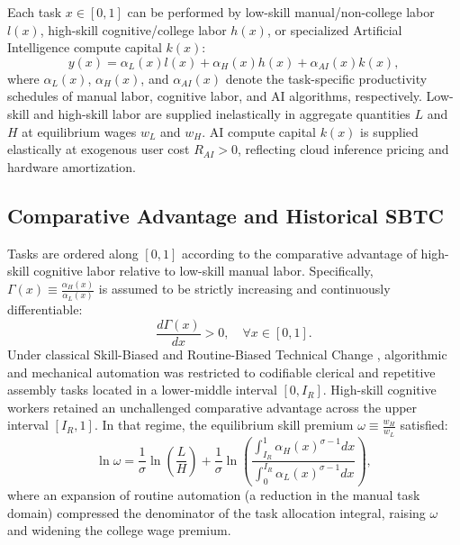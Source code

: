 \documentclass[12pt]{article}
\begin{document}
Each task $x \in [0, 1]$ can be performed by low-skill manual/non-college labor $l(x)$, high-skill cognitive/college labor $h(x)$, or specialized Artificial Intelligence compute capital $k(x)$:
\begin{equation}
\label{eq:task_production}
y(x) = \alpha_L(x) l(x) + \alpha_H(x) h(x) + \alpha_{AI}(x) k(x),
\end{equation}
where $\alpha_L(x)$, $\alpha_H(x)$, and $\alpha_{AI}(x)$ denote the task-specific productivity schedules of manual labor, cognitive labor, and AI algorithms, respectively. Low-skill and high-skill labor are supplied inelastically in aggregate quantities $L$ and $H$ at equilibrium wages $w_L$ and $w_H$. AI compute capital $k(x)$ is supplied elastically at exogenous user cost $R_{AI} > 0$, reflecting cloud inference pricing and hardware amortization.

\subsection{Comparative Advantage and Historical SBTC}

Tasks are ordered along $[0, 1]$ according to the comparative advantage of high-skill cognitive labor relative to low-skill manual labor. Specifically, $\Gamma(x) \equiv \frac{\alpha_H(x)}{\alpha_L(x)}$ is assumed to be strictly increasing and continuously differentiable:
\begin{equation}
\label{eq:comp_advantage}
\frac{d \Gamma(x)}{dx} > 0, \quad \forall x \in [0, 1].
\end{equation}
Under classical Skill-Biased and Routine-Biased Technical Change \citep{autor2003, acemogluRestrepo2020}, algorithmic and mechanical automation was restricted to codifiable clerical and repetitive assembly tasks located in a lower-middle interval $[0, I_R]$. High-skill cognitive workers retained an unchallenged comparative advantage across the upper interval $[I_R, 1]$. In that regime, the equilibrium skill premium $\omega \equiv \frac{w_H}{w_L}$ satisfied:
\begin{equation}
\label{eq:classical_sbtc}
\ln \omega = \frac{1}{\sigma} \ln \left( \frac{L}{H} \right) + \frac{1}{\sigma} \ln \left( \frac{\int_{I_R}^1 \alpha_H(x)^{\sigma - 1} dx}{\int_0^{I_R} \alpha_L(x)^{\sigma - 1} dx} \right),
\end{equation}
where an expansion of routine automation (a reduction in the manual task domain) compressed the denominator of the task allocation integral, raising $\omega$ and widening the college wage premium.
\end{document}
